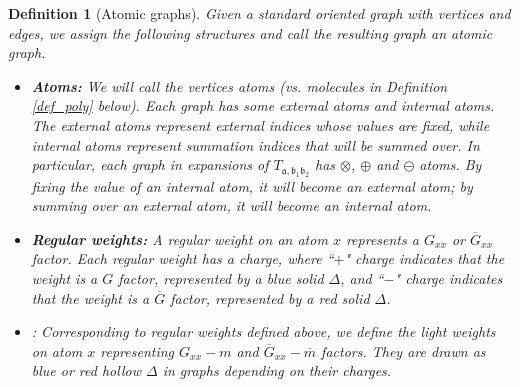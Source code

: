 \documentclass{article}
\newcommand{\1}{\mathds{1}}
\numberwithin{equation}{section}
\newcommand{\fa}{{\mathfrak a}}
\newcommand{\fb}{{\mathfrak b}}
\theoremstyle{plain} %
\newtheorem{definition}[theorem]{Definition}
\theoremstyle{remark}
\begin{document}
  \begin{definition}[Atomic graphs] \label{def_graph1} 
	Given a standard oriented graph with vertices and edges, we assign the following  structures and call the  resulting graph an atomic graph.  
	
	\begin{itemize}
		
		\item {\bf Atoms:} We will call the vertices atoms  (vs. molecules in Definition \ref{def_poly} below). Each graph has some external atoms and internal atoms. 
		The external atoms represent external indices whose values are fixed, while internal atoms represent summation indices that will be summed over. In particular, each graph in expansions of $T_{\fa,\fb_1\fb_2}$ has $\otimes$, $\oplus$ and $\ominus$ atoms. By fixing the value of an internal atom, it will become an external atom; by summing over an external atom, it will become an internal atom. 
		
		\item {\bf Regular weights:}  A regular weight on an atom $x $ represents a $G_{xx}$ or $\overline G_{xx}$ factor. Each regular weight has a charge, where ``$+$" charge indicates that the weight is a $G$ factor, represented by a blue solid $\Delta$, and ``$-$" charge indicates that the weight is a $\overline G$ factor, represented by a red solid $\Delta$. 
				
		\item {}:  Corresponding to regular weights defined above, we define the light weights on atom $x$ representing $G_{xx}-m$ and $\overline G_{xx}-\overline m$ factors. They are drawn as blue or red hollow $\Delta$ in graphs depending on their charges. 
		

\end{itemize}
\end{definition}
\end{document}
